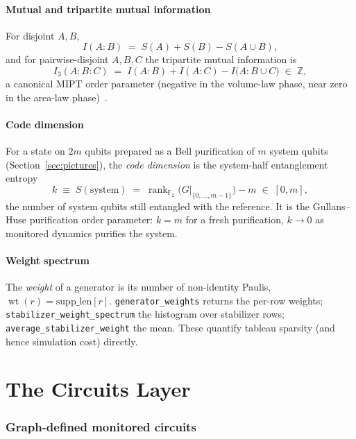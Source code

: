\documentclass[11pt]{article}
\theoremstyle{definition}
\theoremstyle{plain}
\newcommand{\F}{\mathbb{F}}
\newcommand{\Z}{\mathbb{Z}}
\newcommand{\rank}{\operatorname{rank}}
\newcommand{\wt}{\operatorname{wt}}
\begin{document}
\subsection{Mutual and tripartite mutual information}
For disjoint $A,B$,
\begin{equation}
  I(A:B) \;=\; S(A)+S(B)-S(A\cup B),
\end{equation}
and for pairwise-disjoint $A,B,C$ the tripartite mutual information is
\begin{equation}
  I_3(A:B:C) \;=\; I(A:B) + I(A:C) - I\!\bigl(A:B\cup C\bigr)
  \;\in\;\Z ,
\end{equation}
a canonical MIPT order parameter (negative in the volume-law phase, near zero in
the area-law phase)~\cite{GH}.

\subsection{Code dimension}
For a state on $2m$ qubits prepared as a Bell purification of $m$ system qubits
(Section~\ref{sec:pictures}), the \emph{code dimension} is the system-half
entanglement entropy
\begin{equation}
  k \;\equiv\; S(\text{system}) \;=\; \rank_{\F_2}\!\bigl(G|_{\{0,\dots,m-1\}}\bigr) - m
  \;\in\; [0,m] ,
\end{equation}
the number of system qubits still entangled with the reference. It is the
Gullans--Huse purification order parameter: $k=m$ for a fresh purification,
$k\to0$ as monitored dynamics purifies the system.

\subsection{Weight spectrum}
The \emph{weight} of a generator is its number of non-identity Paulis,
$\wt(r)=\mathrm{supp\_len}[r]$. \texttt{generator\_weights} returns the per-row
weights; \texttt{stabilizer\_weight\_spectrum} the histogram over stabilizer
rows; \texttt{average\_stabilizer\_weight} the mean. These quantify tableau
sparsity (and hence simulation cost) directly.

\part{The Circuits Layer}

\section{Graph-defined monitored circuits}
\label{sec:circuits}
\end{document}
